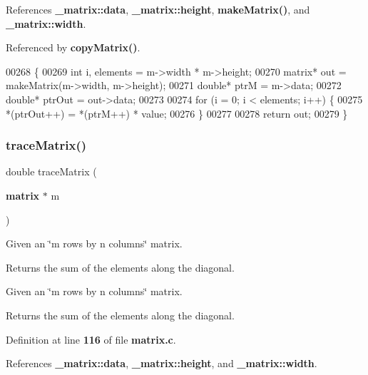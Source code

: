 References \textbf{ \+\_\+matrix\+::data}, \textbf{ \+\_\+matrix\+::height}, \textbf{ make\+Matrix()}, and \textbf{ \+\_\+matrix\+::width}.



Referenced by \textbf{ copy\+Matrix()}.


\begin{DoxyCode}
00268                                              \{
00269     \textcolor{keywordtype}{int} i, elements = m->width * m->height;
00270     matrix* out = makeMatrix(m->width, m->height);
00271     \textcolor{keywordtype}{double}* ptrM = m->data;
00272     \textcolor{keywordtype}{double}* ptrOut = out->data;
00273 
00274     \textcolor{keywordflow}{for} (i = 0; i < elements; i++) \{
00275         *(ptrOut++) = *(ptrM++) * value;
00276     \}
00277 
00278     \textcolor{keywordflow}{return} out;
00279 \}
\end{DoxyCode}
\mbox{\label{matrix_8h_a4794df8b2032f961dd8b2d90276bc417}} 
\subsubsection{trace\+Matrix()}
{\footnotesize\ttfamily double trace\+Matrix (\begin{DoxyParamCaption}\item[{\textbf{ matrix} $\ast$}]{m }\end{DoxyParamCaption})}



Given an \char`\"{}m rows by n columns\char`\"{} matrix. 

\begin{DoxyReturn}{Returns}
the sum of the elements along the diagonal.
\end{DoxyReturn}
Given an \char`\"{}m rows by n columns\char`\"{} matrix.

\begin{DoxyReturn}{Returns}
the sum of the elements along the diagonal. 
\end{DoxyReturn}


Definition at line \textbf{ 116} of file \textbf{ matrix.\+c}.



References \textbf{ \+\_\+matrix\+::data}, \textbf{ \+\_\+matrix\+::height}, and \textbf{ \+\_\+matrix\+::width}.


